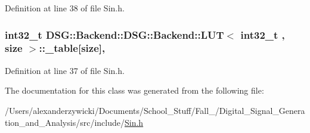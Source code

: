 Definition at line 38 of file Sin.\+h.

\hypertarget{classDSG_1_1Backend_1_1DSG_1_1Backend_1_1LUT_a427da4b7eccdfe25e3c1889a8c2fdea6}{
\subsubsection[{\+\_\+table}]{\setlength{\rightskip}{0pt plus 5cm}int32\+\_\+t  {\bf D\+S\+G\+::\+Backend\+::\+D\+S\+G\+::\+Backend\+::\+L\+U\+T}$<$ int32\+\_\+t , size $>$\+::\+\_\+table\mbox{[}size\mbox{]}\hspace{0.3cm}{\ttfamily [protected]}, {\ttfamily [inherited]}}}\label{classDSG_1_1Backend_1_1DSG_1_1Backend_1_1LUT_a427da4b7eccdfe25e3c1889a8c2fdea6}


Definition at line 37 of file Sin.\+h.



The documentation for this class was generated from the following file\+:\begin{DoxyCompactItemize}
\item 
/\+Users/alexanderzywicki/\+Documents/\+School\+\_\+\+Stuff/\+Fall\+\_/\+Digital\+\_\+\+Signal\+\_\+\+Generation\+\_\+and\+\_\+\+Analysis/src/include/\hyperlink{Sin_8h}{Sin.\+h}\end{DoxyCompactItemize}
